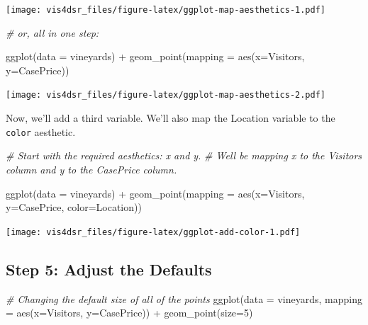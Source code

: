 \documentclass[
]{krantz}
\makeatletter
\newenvironment{Shaded}{\begin{snugshade}}{\end{snugshade}}
\newcommand{\AttributeTok}[1]{\textcolor[rgb]{0.61,0.61,0.61}{#1}}
\newcommand{\CommentTok}[1]{\textcolor[rgb]{0.37,0.37,0.37}{\textit{#1}}}
\newcommand{\DecValTok}[1]{\textcolor[rgb]{0.06,0.06,0.06}{#1}}
\newcommand{\FunctionTok}[1]{\textcolor[rgb]{0,0,0}{#1}}
\newcommand{\NormalTok}[1]{#1}
\newcommand{\SpecialCharTok}[1]{\textcolor[rgb]{0,0,0}{#1}}
\newenvironment{kframe}{%
\medskip{}
\setlength{\fboxsep}{.8em}
 \def\at@end@of@kframe{}%
 \ifinner\ifhmode%
  \def\at@end@of@kframe{\end{minipage}}%
  \begin{minipage}{\columnwidth}%
 \fi\fi%
 \def\FrameCommand##1{\hskip\@totalleftmargin \hskip-\fboxsep
 \colorbox{shadecolor}{##1}\hskip-\fboxsep
     \hskip-\linewidth \hskip-\@totalleftmargin \hskip\columnwidth}%
 \MakeFramed {\advance\hsize-\width
   \@totalleftmargin\z@ \linewidth\hsize
   \@setminipage}}%
 {\par\unskip\endMakeFramed%
 \at@end@of@kframe}
\renewenvironment{Shaded}{\begin{kframe}}{\end{kframe}}
\makeatother
\begin{document}
\texttt{[image: vis4dsr\_files/figure-latex/ggplot-map-aesthetics-1.pdf]}

\begin{Shaded}
\begin{Highlighting}[]
\CommentTok{\# or, all in one step:}

\FunctionTok{ggplot}\NormalTok{(}\AttributeTok{data =}\NormalTok{ vineyards) }\SpecialCharTok{+}
  \FunctionTok{geom\_point}\NormalTok{(}\AttributeTok{mapping =} \FunctionTok{aes}\NormalTok{(}\AttributeTok{x=}\NormalTok{Visitors, }\AttributeTok{y=}\NormalTok{CasePrice))}
\end{Highlighting}
\end{Shaded}

\texttt{[image: vis4dsr\_files/figure-latex/ggplot-map-aesthetics-2.pdf]}

Now, we'll add a third variable. We'll also map the Location variable to the \texttt{color} aesthetic.

\begin{Shaded}
\begin{Highlighting}[]
\CommentTok{\# Start with the required aesthetics: x and y.}
\CommentTok{\# We\textquotesingle{}ll be mapping x to the Visitors column and y to the CasePrice column.}

\FunctionTok{ggplot}\NormalTok{(}\AttributeTok{data =}\NormalTok{ vineyards) }\SpecialCharTok{+}
  \FunctionTok{geom\_point}\NormalTok{(}\AttributeTok{mapping =} \FunctionTok{aes}\NormalTok{(}\AttributeTok{x=}\NormalTok{Visitors, }\AttributeTok{y=}\NormalTok{CasePrice, }\AttributeTok{color=}\NormalTok{Location))}
\end{Highlighting}
\end{Shaded}

\texttt{[image: vis4dsr\_files/figure-latex/ggplot-add-color-1.pdf]}

\hypertarget{step-5-adjust-the-defaults}{%
\subsection{Step 5: Adjust the Defaults}\label{step-5-adjust-the-defaults}}

\begin{Shaded}
\begin{Highlighting}[]
\CommentTok{\# Changing the default size of all of the points}
\FunctionTok{ggplot}\NormalTok{(}\AttributeTok{data =}\NormalTok{ vineyards, }\AttributeTok{mapping =} \FunctionTok{aes}\NormalTok{(}\AttributeTok{x=}\NormalTok{Visitors, }\AttributeTok{y=}\NormalTok{CasePrice)) }\SpecialCharTok{+}
  \FunctionTok{geom\_point}\NormalTok{(}\AttributeTok{size=}\DecValTok{5}\NormalTok{)}
\end{Highlighting}
\end{Shaded}
\end{document}
